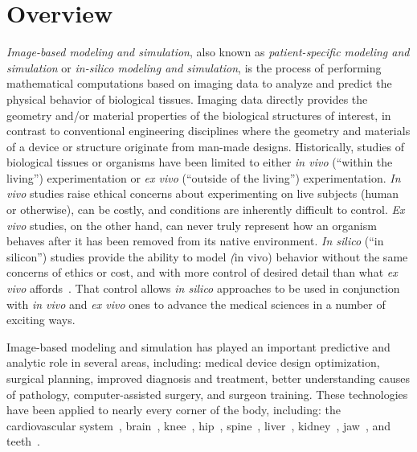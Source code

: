 \chapter{Overview}
%

\textit{Image-based modeling and simulation}, also known as \textit{patient-specific modeling and simulation} or \textit{in-silico modeling and simulation}, is the process of performing mathematical computations based on imaging data to analyze and predict the physical behavior of biological tissues. Imaging data directly provides the geometry and/or material properties of the biological structures of interest, in contrast to conventional engineering disciplines where the geometry and materials of a device or structure originate from man-made designs. Historically, studies of biological tissues or organisms have been limited to either \textit{in vivo} (``within the living'') experimentation or \textit{ex vivo} (``outside of the living'') experimentation. \textit{In vivo} studies raise ethical concerns about experimenting on live subjects (human or otherwise), can be costly, and conditions are inherently difficult to control. \textit{Ex vivo} studies, on the other hand, can never truly represent how an organism behaves after it has been removed from its native environment. \textit{In silico} (``in silicon'') studies provide the ability to model \textit(in vivo) behavior without the same concerns of ethics or cost, and with more control of desired detail than what \textit{ex vivo} affords~\cite{colquitt_2011}. That control allows \textit{in silico} approaches to be used in conjunction with \textit{in vivo} and \textit{ex vivo} ones to advance the medical sciences in a number of exciting ways.


Image-based modeling and simulation has played an important predictive and analytic role in several areas, including:  medical device design optimization,  surgical planning, improved diagnosis and treatment, better understanding causes of pathology, computer-assisted surgery, and surgeon training. These technologies have been applied to nearly every corner of the body, including: the cardiovascular system~\cite{min_2015, updegrove_2016}, brain~\cite{weickenmeier_2016, behnia_2008}, knee~\cite{erdemir_2015, donahue_2002}, hip~\cite{anderson_2008, el'sheikh_2003}, spine~\cite{malandrino_2014, dumas_2005}, liver~\cite{shi_2008, schwen_2014}, kidney~\cite{eloot_2002, snedeker_2005}, jaw~\cite{idrus_2017, narra_2014}, and teeth~\cite{frisardi_2011, geng_2001}. 


